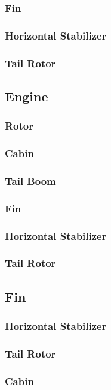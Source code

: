 \documentclass[12pt,a4paper]{article}
\begin{document}
\subsubsection{Fin}
\subsubsection{Horizontal Stabilizer}
\subsubsection{Tail Rotor}
\subsection{Engine}
\subsubsection{Rotor}
\subsubsection{Cabin}
\subsubsection{Tail Boom}
\subsubsection{Fin}
\subsubsection{Horizontal Stabilizer}
\subsubsection{Tail Rotor}
\subsection{Fin}
\subsubsection{Horizontal Stabilizer}
\subsubsection{Tail Rotor}
\subsubsection{Cabin}
\end{document}
